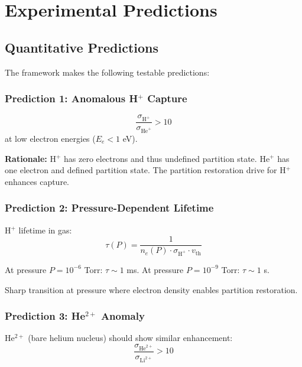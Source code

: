 \documentclass[twocolumn,10pt,a4paper]{article}
\theoremstyle{definition}
\theoremstyle{remark}
\begin{document}
\section{Experimental Predictions}
\label{sec:predictions}

\subsection{Quantitative Predictions}

The framework makes the following testable predictions:

\subsubsection{Prediction 1: Anomalous H$^+$ Capture}

\begin{equation}
    \frac{\sigma_{\text{H}^+}}{\sigma_{\text{He}^+}} > 10
\end{equation}
at low electron energies ($E_e < 1$ eV).

\textbf{Rationale:} H$^+$ has zero electrons and thus undefined partition state. He$^+$ has one electron and defined partition state. The partition restoration drive for H$^+$ enhances capture.

\subsubsection{Prediction 2: Pressure-Dependent Lifetime}

H$^+$ lifetime in gas:
\begin{equation}
    \tau(P) = \frac{1}{n_e(P) \cdot \sigma_{\text{H}^+} \cdot v_{\text{th}}}
\end{equation}

At pressure $P = 10^{-6}$ Torr: $\tau \sim 1$ ms.
At pressure $P = 10^{-9}$ Torr: $\tau \sim 1$ s.

Sharp transition at pressure where electron density enables partition restoration.

\subsubsection{Prediction 3: He$^{2+}$ Anomaly}

He$^{2+}$ (bare helium nucleus) should show similar enhancement:
\begin{equation}
    \frac{\sigma_{\text{He}^{2+}}}{\sigma_{\text{Li}^{2+}}} > 10
\end{equation}
\end{document}
